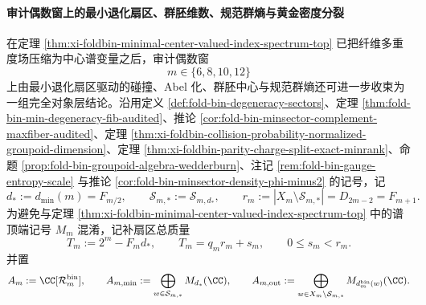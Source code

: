 \paragraph{审计偶数窗上的最小退化扇区、群胚维数、规范群熵与黄金密度分裂}
在定理 \ref{thm:xi-foldbin-minimal-center-valued-index-spectrum-top} 已把纤维多重度场压缩为中心谱变量之后，审计偶数窗
\[
m\in\{6,8,10,12\}
\]
上由最小退化扇区驱动的碰撞、Abel 化、群胚中心与规范群熵还可进一步收束为一组完全对象层结论。沿用定义 \ref{def:fold-bin-degeneracy-sectors}、定理 \ref{thm:fold-bin-min-degeneracy-fib-audited}、推论 \ref{cor:fold-bin-minsector-complement-maxfiber-audited}、定理 \ref{thm:xi-foldbin-collision-probability-normalized-groupoid-dimension}、定理 \ref{thm:xi-foldbin-parity-charge-split-exact-minrank}、命题 \ref{prop:fold-bin-groupoid-algebra-wedderburn}、注记 \ref{rem:fold-bin-gauge-entropy-scale} 与推论 \ref{cor:fold-bin-minsector-density-phi-minus2} 的记号，记
\[
d_*:=d_{\min}(m)=F_{m/2},
\qquad
\mathcal S_{m,*}:=\mathcal S_{m,d_*},
\qquad
r_m:=|X_m\setminus \mathcal S_{m,*}|=D_{2m-2}=F_{m+1}.
\]
为避免与定理 \ref{thm:xi-foldbin-minimal-center-valued-index-spectrum-top} 中的谱顶端记号 \(M_m\) 混淆，记补扇区总质量
\[
T_m:=2^m-F_m d_*,
\qquad
T_m=q_m r_m+s_m,\qquad 0\le s_m<r_m.
\]
并置
\[
A_m:=\CC[\mathcal R_m^{\mathrm{bin}}],
\qquad
A_{m,\min}:=\bigoplus_{w\in\mathcal S_{m,*}}M_{d_*}(\CC),
\qquad
A_{m,\mathrm{out}}:=\bigoplus_{w\in X_m\setminus\mathcal S_{m,*}}
M_{d_m^{\mathrm{bin}}(w)}(\CC).
\]

